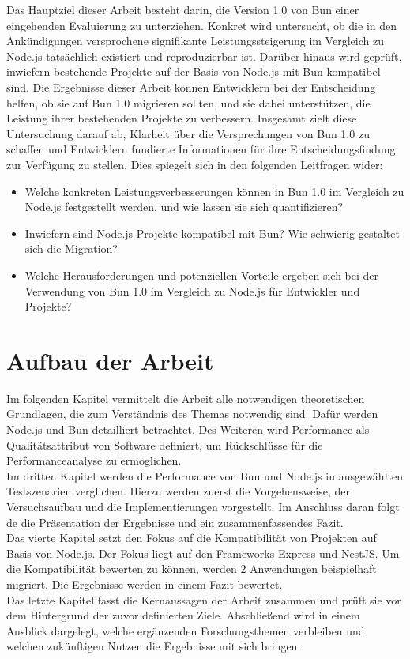 \noindent
Das Hauptziel dieser Arbeit besteht darin, die Version 1.0 von Bun einer eingehenden Evaluierung zu unterziehen. Konkret wird untersucht, ob die in den Ankündigungen versprochene signifikante Leistungssteigerung im Vergleich zu Node.js tatsächlich existiert und reproduzierbar ist. Darüber hinaus wird geprüft, inwiefern bestehende Projekte auf der Basis von Node.js mit Bun kompatibel sind. Die Ergebnisse dieser Arbeit können Entwicklern bei der Entscheidung helfen, ob sie auf Bun 1.0 migrieren sollten, und sie dabei unterstützen, die Leistung ihrer bestehenden Projekte zu verbessern. Insgesamt zielt diese Untersuchung darauf ab, Klarheit über die Versprechungen von Bun 1.0 zu schaffen und Entwicklern fundierte Informationen für ihre Entscheidungsfindung zur Verfügung zu stellen. Dies spiegelt sich in den folgenden Leitfragen wider:
\begin{itemize}
    \item Welche konkreten Leistungsverbesserungen können in Bun 1.0 im Vergleich zu Node.js festgestellt werden, und wie lassen sie sich quantifizieren?
    \item Inwiefern sind Node.js-Projekte kompatibel mit Bun? Wie schwierig gestaltet sich die Migration?
    \item Welche Herausforderungen und potenziellen Vorteile ergeben sich bei der Verwendung von Bun 1.0 im Vergleich zu Node.js für Entwickler und Projekte?
\end{itemize}

\section{Aufbau der Arbeit} \label{sec:introduction-overview}
Im folgenden Kapitel vermittelt die Arbeit alle notwendigen theoretischen Grundlagen, die zum Verständnis des Themas notwendig sind. Dafür werden Node.js und Bun detailliert betrachtet. Des Weiteren wird Performance als Qualitätsattribut von Software definiert, um Rückschlüsse für die Performanceanalyse zu ermöglichen.\\

\noindent
Im dritten Kapitel werden die Performance von Bun und Node.js in ausgewählten Testszenarien verglichen. Hierzu werden zuerst die Vorgehensweise, der Versuchsaufbau und die Implementierungen vorgestellt. Im Anschluss daran folgt de die Präsentation der Ergebnisse und ein zusammenfassendes Fazit.\\

\noindent
Das vierte Kapitel setzt den Fokus auf die Kompatibilität von Projekten auf Basis von Node.js. Der Fokus liegt auf den Frameworks Express und NestJS. Um die Kompatibilität bewerten zu können, werden 2 Anwendungen beispielhaft migriert. Die Ergebnisse werden in einem Fazit bewertet.\\

\noindent
Das letzte Kapitel fasst die Kernaussagen der Arbeit zusammen und prüft sie vor dem Hintergrund der zuvor definierten Ziele. Abschließend wird in einem Ausblick dargelegt, welche ergänzenden Forschungsthemen verbleiben und welchen zukünftigen Nutzen die Ergebnisse mit sich bringen.